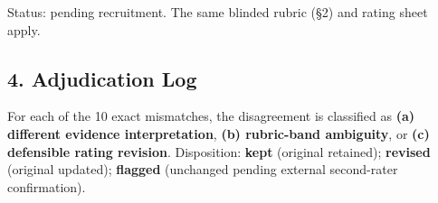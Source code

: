 Status: pending recruitment. The same blinded rubric (§2) and rating sheet apply.

\bigskip


\subsection*{4. Adjudication Log}

\noindent For each of the 10 exact mismatches, the disagreement is classified as
\textbf{(a) different evidence interpretation}, \textbf{(b) rubric-band ambiguity},
or \textbf{(c) defensible rating revision}. Disposition: \textbf{kept} (original
retained); \textbf{revised} (original updated); \textbf{flagged} (unchanged pending
external second-rater confirmation).

\renewcommand{\arraystretch}{1.35}
\setlength{\tabcolsep}{4pt}

